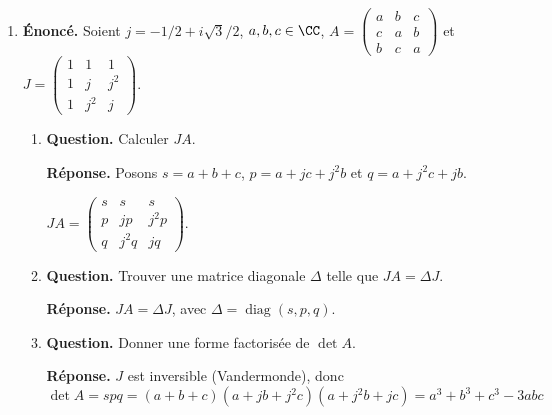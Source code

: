 \documentclass[12pt, a4paper]{article}
\begin{document}
\begin{enumerate}[label=5.\arabic*., start=54]
\begin{minipage}[t]{\linewidth}
\begin{enumerate}[\arabic*.]
  \item \textbf{Question.} Pour $M\in\operatorname{GL}_n(K)$, résoudre $M=\operatorname{Com}(X)$.
\par\smallskip
\textbf{Réponse.} Si $M=\operatorname{Com}(X)$ est inversible, alors $t=\det X\neq0$ vérifie $t^{n-1}=\det M$ et $X=tM^{-\top}$.
        Réciproquement, chaque tel $t\in K$ fournit une solution.
        \[
          \therefore\mathcal S=\{tM^{-\top}:t\in K,\ t^{n-1}=\det M\}
        \]

\end{enumerate}
\end{minipage}

  \item \begin{minipage}[t]{\linewidth}\raggedright
\textbf{Énoncé.} Soient $j=-1/2+i\sqrt3/2$, $a,b,c\in\CC$, $\displaystyle A=\begin{pmatrix}a&b&c\\c&a&b\\b&c&a\end{pmatrix}$ et $\displaystyle J=\begin{pmatrix}1&1&1\\1&j&j^2\\1&j^2&j\end{pmatrix}$.

\begin{enumerate}[\arabic*.]
        \item \textbf{Question.} Calculer $JA$.
\par\smallskip
\textbf{Réponse.} Posons $s=a+b+c$, $p=a+jc+j^2b$ et $q=a+j^2c+jb$.

$\displaystyle JA=\begin{pmatrix}s&s&s\\p&jp&j^2p\\q&j^2q&jq\end{pmatrix}$.

  \item \textbf{Question.} Trouver une matrice diagonale $\Delta$ telle que $JA=\Delta J$.
\par\smallskip
\textbf{Réponse.} $JA=\Delta J$, avec $\Delta=\operatorname{diag}(s,p,q)$.

  \item \textbf{Question.} Donner une forme factorisée de $\det A$.
\par\smallskip
\textbf{Réponse.} $J$ est inversible (Vandermonde), donc
        \[
          \det A=spq=(a+b+c)(a+jb+j^2c)(a+j^2b+jc)
          =a^3+b^3+c^3-3abc
        \]


\end{enumerate}
\end{minipage}
\end{enumerate}
\end{document}
